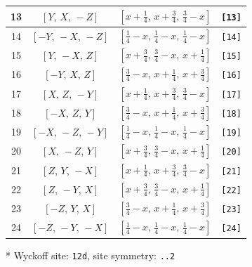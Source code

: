 \documentclass[fleqn,8pt]{jsarticle}
\begin{document}
\begin{longtable}{cccc}
13 & $\left[ Y,\, X,\, - Z \right]$ & $\left[ x + \frac{1}{4},\, x + \frac{3}{4},\, \frac{3}{4} - x \right]$ & {\tt [13]} \\ \hline
14 & $\left[ - Y,\, - X,\, - Z \right]$ & $\left[ \frac{1}{4} - x,\, \frac{1}{4} - x,\, \frac{1}{4} - x \right]$ & {\tt [14]} \\ \hline
15 & $\left[ Y,\, - X,\, Z \right]$ & $\left[ x + \frac{3}{4},\, \frac{3}{4} - x,\, x + \frac{1}{4} \right]$ & {\tt [15]} \\ \hline
16 & $\left[ - Y,\, X,\, Z \right]$ & $\left[ \frac{3}{4} - x,\, x + \frac{1}{4},\, x + \frac{3}{4} \right]$ & {\tt [16]} \\ \hline
17 & $\left[ X,\, Z,\, - Y \right]$ & $\left[ x + \frac{1}{4},\, x + \frac{3}{4},\, \frac{3}{4} - x \right]$ & {\tt [17]} \\ \hline
18 & $\left[ - X,\, Z,\, Y \right]$ & $\left[ \frac{3}{4} - x,\, x + \frac{1}{4},\, x + \frac{3}{4} \right]$ & {\tt [18]} \\ \hline
19 & $\left[ - X,\, - Z,\, - Y \right]$ & $\left[ \frac{1}{4} - x,\, \frac{1}{4} - x,\, \frac{1}{4} - x \right]$ & {\tt [19]} \\ \hline
20 & $\left[ X,\, - Z,\, Y \right]$ & $\left[ x + \frac{3}{4},\, \frac{3}{4} - x,\, x + \frac{1}{4} \right]$ & {\tt [20]} \\ \hline
21 & $\left[ Z,\, Y,\, - X \right]$ & $\left[ x + \frac{1}{4},\, x + \frac{3}{4},\, \frac{3}{4} - x \right]$ & {\tt [21]} \\ \hline
22 & $\left[ Z,\, - Y,\, X \right]$ & $\left[ x + \frac{3}{4},\, \frac{3}{4} - x,\, x + \frac{1}{4} \right]$ & {\tt [22]} \\ \hline
23 & $\left[ - Z,\, Y,\, X \right]$ & $\left[ \frac{3}{4} - x,\, x + \frac{1}{4},\, x + \frac{3}{4} \right]$ & {\tt [23]} \\ \hline
24 & $\left[ - Z,\, - Y,\, - X \right]$ & $\left[ \frac{1}{4} - x,\, \frac{1}{4} - x,\, \frac{1}{4} - x \right]$ & {\tt [24]} \\
\end{longtable}
* Wyckoff site: {\tt 12d}, site symmetry: {\tt ..2}
\renewcommand{\arraystretch}{1.2}
\end{document}
